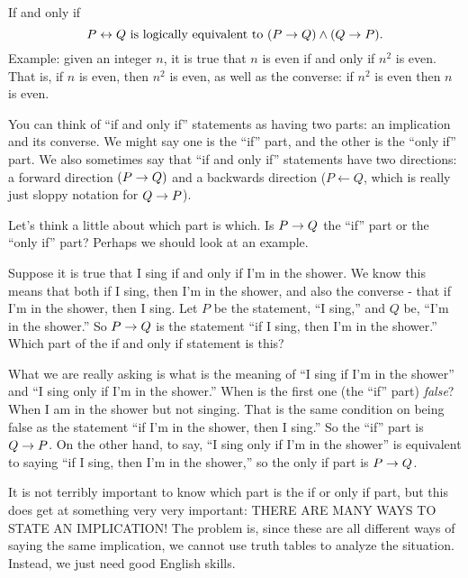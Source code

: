 \documentclass[12pt]{article}
\begin{document}
\begin{defbox}{If and only if}
\[ P \leftrightarrow Q \mbox{ is logically equivalent to } (P \rightarrow Q) \wedge (Q \rightarrow P).\]
Example: given an integer $n$, it is true that $n$ is even if and only if $n^2$ is even.  That is, if $n$ is even, then $n^2$ is even, as well as the converse: if $n^2$ is even then $n$ is even.
\end{defbox}

You can think of ``if and only if'' statements as having two parts: an implication and its converse.  We might say one is the ``if'' part, and the other is the ``only if'' part.  We also sometimes say that ``if and only if'' statements have two directions: a forward direction $(P \rightarrow Q)$ and a backwards direction ($P \leftarrow Q$, which is really just sloppy notation for $Q \rightarrow P$).  

Let's think a little about which part is which.  Is $P \rightarrow Q$ the ``if'' part or the ``only if'' part?  Perhaps we should look at an example.

\begin{example}
 Suppose it is true that I sing if and only if I'm in the shower.  We know this means that both if I sing, then I'm in the shower, and also the converse - that if I'm in the shower, then I sing.  Let $P$ be the statement, ``I sing,'' and $Q$ be, ``I'm in the shower.''  So $P \rightarrow Q$ is the statement ``if I sing, then I'm in the shower.''  Which part of the if and only if statement is this?
 
 What we are really asking is what is the meaning of ``I sing if I'm in the shower'' and ``I sing only if I'm in the shower.''  When is the first one (the ``if'' part) {\em false}?  When I am in the shower but not singing.  That is the same condition on being false as the statement ``if I'm in the shower, then I sing.''  So the ``if'' part is $Q \rightarrow P$.  On the other hand, to say, ``I sing only if I'm in the shower'' is equivalent to saying ``if I sing, then I'm in the shower,'' so the only if part is $P \rightarrow Q$.
\end{example}

It is not terribly important to know which part is the if or only if part, but this does get at something very very important: THERE ARE MANY WAYS TO STATE AN IMPLICATION!  The problem is, since these are all different ways of saying the same implication, we cannot use truth tables to analyze the situation.  Instead, we just need good English skills.
\end{document}
